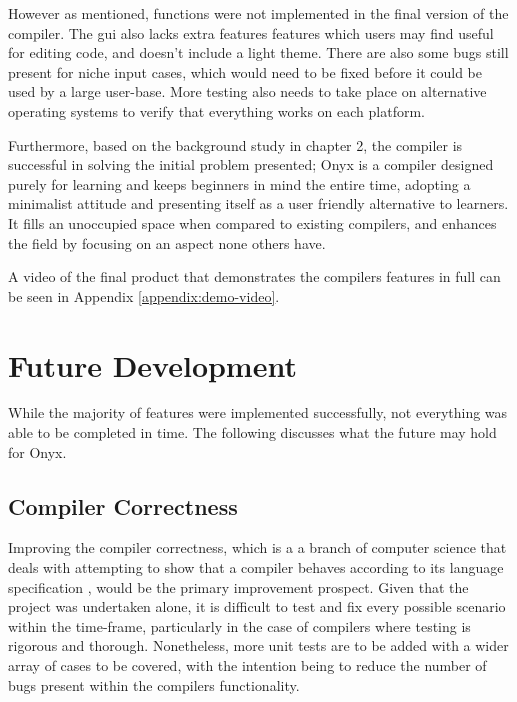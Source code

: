 \documentclass[
]{report}
\begin{document}
However as mentioned, functions were not implemented in the final
version of the compiler. The \acrshort{gui} also lacks extra features
features which users may find useful for editing code, and doesn't
include a light theme. There are also some bugs still present for niche
input cases, which would need to be fixed before it could be used by a
large user-base. More testing also needs to take place on alternative
operating systems to verify that everything works on each platform.

Furthermore, based on the background study in chapter 2, the compiler is
successful in solving the initial problem presented; Onyx is a compiler
designed purely for learning and keeps beginners in mind the entire
time, adopting a minimalist attitude and presenting itself as a user
friendly alternative to learners. It fills an unoccupied space when
compared to existing compilers, and enhances the field by focusing on an
aspect none others have.

A video of the final product that demonstrates the compilers features
in full can be seen in Appendix \ref{appendix:demo-video}.

\section{Future Development}
While the majority of features were implemented successfully, not
everything was able to be completed in time. The following discusses
what the future may hold for Onyx.

\subsection{Compiler Correctness}
Improving the compiler correctness, which is a a branch of computer
science that deals with attempting to show that a compiler behaves
according to its language specification \cite{correctness-wiki}, would be the primary
improvement prospect. Given that the project was undertaken alone, it is
difficult to test and fix every possible scenario within the time-frame,
particularly in the case of compilers where testing is rigorous and
thorough. Nonetheless, more unit tests are to be added with a wider
array of cases to be covered, with the intention being to reduce the
number of bugs present within the compilers functionality.
\end{document}
